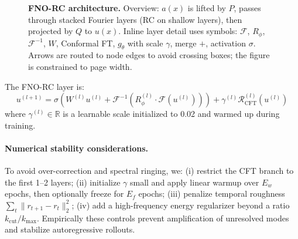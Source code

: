\documentclass[11pt]{article}
\newcommand{\R}{\mathbb{R}}
\newcommand{\F}{\mathcal{F}}
\begin{document}
\begin{figure}[t]
{}%
\caption{\textbf{FNO-RC architecture.} Overview: $a(x)$ is lifted by $P$, passes through stacked Fourier layers (RC on shallow layers), then projected by $Q$ to $u(x)$. Inline layer detail uses symbols: $\mathcal{F}$, $R_{\phi}$, $\mathcal{F}^{-1}$, $W$, Conformal FT, $g_{\theta}$ with scale $\gamma$, merge $+$, activation $\sigma$. Arrows are routed to node edges to avoid crossing boxes; the figure is constrained to page width.}
\label{fig:architecture}
\end{figure}

The FNO-RC layer is:
\begin{equation}
u^{(l+1)} = \sigma\left( W^{(l)} u^{(l)} + \F^{-1}\left( R_\phi^{(l)} \cdot \F(u^{(l)}) \right) \right) + \gamma^{(l)} \mathcal{R}_{\text{CFT}}^{(l)}(u^{(l)})
\end{equation}
where $\gamma^{(l)} \in \R$ is a learnable scale initialized to 0.02 and warmed up during training.

\paragraph{Numerical stability considerations.} To avoid over-correction and spectral ringing, we: (i) restrict the CFT branch to the first 1–2 layers; (ii) initialize $\gamma$ small and apply linear warmup over $E_w$ epochs, then optionally freeze for $E_f$ epochs; (iii) penalize temporal roughness $\sum_t \|r_{t+1}-r_t\|_2^2$; (iv) add a high-frequency energy regularizer beyond a ratio $k_{\mathrm{cut}}/k_{\max}$. Empirically these controls prevent amplification of unresolved modes and stabilize autoregressive rollouts.
\end{document}
